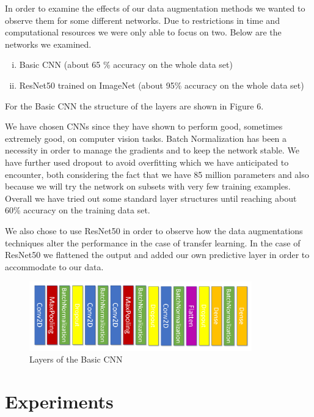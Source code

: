 \documentclass{article}
\begin{document}
In order to examine the effects of our data augmentation methods we wanted to observe them for some different networks. Due to restrictions in time and computational resources we were only able to focus on two. Below are the networks we examined.

\begin{enumerate}[(i)]
 \item Basic CNN (about 65 \% accuracy on the whole data set)
 \item ResNet50 trained on ImageNet (about 95\% accuracy on the whole data set)
\end{enumerate}

For the Basic CNN the structure of the layers are shown in Figure 6.

We have chosen CNNs since they have shown to perform good, sometimes extremely good, on computer vision tasks. Batch Normalization has been a necessity in order to manage the gradients and to keep the network stable. We have further used dropout to avoid overfitting which we have anticipated to encounter, both considering the fact that we have 85 million parameters and also because we will try the network on subsets with very few training examples. Overall we have tried out some standard layer structures until reaching about 60\% accuracy on the training data set.

We also chose to use ResNet50 in order to observe how the data augmentations techniques alter the performance in the case of transfer learning. In the case of ResNet50 we flattened the output and added our own predictive layer in order to accommodate to our data.

\begin{figure}[H]
	\centering
	\includegraphics[height=3cm]{conv.PNG}
	\caption{Layers of the Basic CNN}
\end{figure}


\section{Experiments}

% 
\end{document}
